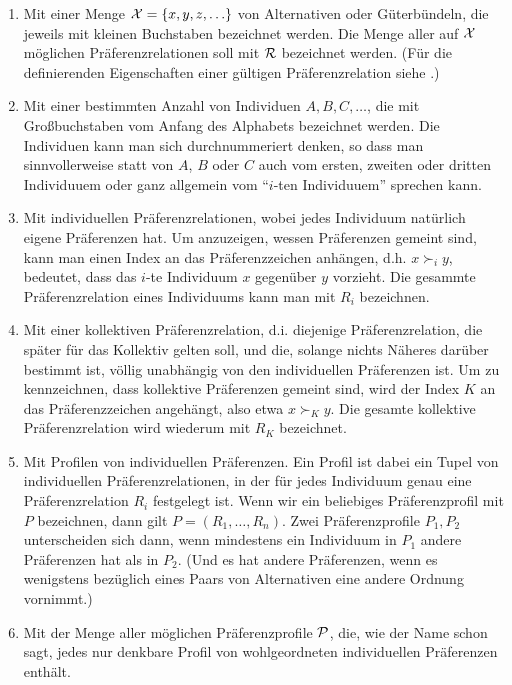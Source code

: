 \begin{enumerate}
  \item Mit einer Menge ${\cal X} = \{x, y, z, \ldots\}$ von Alternativen oder
  Güterbündeln, die jeweils mit kleinen Buchstaben bezeichnet werden. Die Menge
  aller auf ${\cal X}$ möglichen Präferenzrelationen soll mit ${\cal R}$
  bezeichnet werden. (Für die definierenden Eigenschaften einer gültigen
  Präferenzrelation siehe \pageref{Ordnungsaxiome}.)
 
  \item Mit einer bestimmten Anzahl von Individuen $A, B, C, \ldots$, die mit
  Großbuchstaben vom Anfang des Alphabets bezeichnet werden. Die Individuen kann
  man sich durchnummeriert denken, so dass man sinnvollerweise statt von $A$, $B$ oder
  $C$ auch vom ersten, zweiten oder dritten Individuuem oder ganz allgemein vom
   "`$i$-ten Individuuem"' sprechen kann.
  
  \item Mit individuellen Prä\-fer\-enz\-re\-la\-tion\-en, wobei jedes
  Individuum na\-tür\-lich eigene Prä\-fer\-enz\-en hat. Um anzuzeigen, wessen
  Präferenzen gemeint sind, kann man einen Index an das Präferenzzeichen
  anhängen, d.h. $x \succ_i y$, bedeutet, dass das $i$-te Individuum $x$
  gegenüber $y$ vorzieht. Die gesammte Präferenzrelation eines Individuums kann
  man mit $R_i$ bezeichnen.
 
  \item Mit einer kollektiven Prä\-fer\-enz\-re\-la\-tion, d.i. diejenige 
  Prä\-fer\-enz\-re\-la\-tion, die später für das Kollektiv gelten soll, und
  die, solange nichts Näheres darüber bestimmt ist, völlig unabhängig von den
  individuellen Präferenzen ist. Um zu kennzeichnen, dass kollektive Präferenzen gemeint
  sind, wird der Index $K$ an das Präferenzzeichen angehängt, also etwa
  $x \succ_K y$. Die gesamte kollektive Präferenzrelation wird wiederum mit
  $R_K$ bezeichnet.
   
  \item Mit Profilen von individuellen Präferenzen. Ein Profil ist dabei ein
  Tupel von individuellen Präferenzrelationen, in der für jedes Individuum
  genau eine Präferenzrelation $R_i$ festgelegt ist. Wenn wir ein
  beliebiges Präferenzprofil mit $P$ bezeichnen, dann gilt $P =
  (R_1,\ldots, R_n)$. Zwei Präferenzprofile $P_1, P_2$
  unterscheiden sich dann, wenn mindestens ein Individuum in $P_1$ andere 
  Präferenzen hat als in $P_2$.
  (Und es hat andere Präferenzen, wenn es wenigstens bezüglich eines Paars von 
  Alternativen eine andere Ordnung vornimmt.)
  
  \item Mit der Menge aller möglichen Präferenzprofile ${\cal P}$, die, wie der
  Name schon sagt, jedes nur denkbare Profil von wohlgeordneten
  individuellen Präferenzen enthält.
\end{enumerate}

